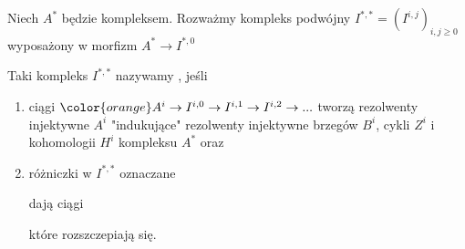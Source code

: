   \begin{definition}\label{rezolwenta C-E}
    Niech $A^*$ będzie kompleksem. Rozważmy kompleks podwójny $I^{*,*}=(I^{i,j})_{i,j\geq 0}$ wyposażony w morfizm $A^*\to I^{*,0}$

    \begin{center}
    \end{center}

    Taki kompleks $I^{*,*}$ nazywamy , jeśli
    \begin{enumerate}
      \item ciągi $\color{orange}A^i\to I^{i,0}\to I^{i, 1}\to I^{i,2} \to ...$ tworzą rezolwenty injektywne $A^i$ "indukujące" rezolwenty injektywne brzegów $B^i$, cykli $Z^i$ i kohomologii $H^i$ kompleksu $A^*$ oraz
      \item różniczki w $I^{*,*}$ oznaczane
    \begin{center}\end{center}
    dają ciągi 
    \begin{center}\end{center}
    które rozszczepiają się.
\end{enumerate}
  \end{definition}

